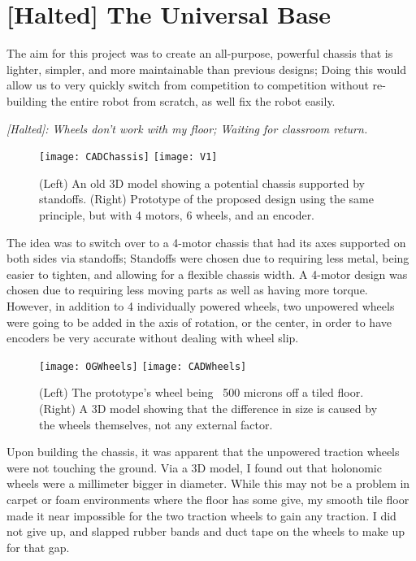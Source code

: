 \section{[Halted] The Universal Base}

The aim for this project was to create an all-purpose, powerful chassis that is lighter, simpler, and more maintainable than previous designs; Doing this would allow us to very quickly switch from competition to competition without re-building the entire robot from scratch, as well fix the robot easily.

\textit{[Halted]: Wheels don't work with my floor; Waiting for classroom return.}

\begin{figure}[h]
    \centering
    \texttt{[image: CADChassis]}
    \texttt{[image: V1]}
    \caption{
        (Left) An old 3D model showing a potential chassis supported by standoffs. (Right) Prototype of the proposed design using the same principle, but with 4 motors, 6 wheels, and an encoder.
    }
\end{figure}

The idea was to switch over to a 4-motor chassis that had its axes supported on both sides via standoffs; Standoffs were chosen due to requiring less metal, being easier to tighten, and allowing for a flexible chassis width. A 4-motor design was chosen due to requiring less moving parts as well as having more torque. However, in addition to 4 individually powered wheels, two unpowered wheels were going to be added in the axis of rotation, or the center, in order to have encoders be very accurate without dealing with wheel slip.

\begin{figure}[h]
    \centering
    \texttt{[image: OGWheels]}
    \texttt{[image: CADWheels]}
    \caption{
        (Left) The prototype's wheel being ~500 microns off a tiled floor. (Right) A 3D model showing that the difference in size is caused by the wheels themselves, not any external factor.
    }
\end{figure}

Upon building the chassis, it was apparent that the unpowered traction wheels were not touching the ground. Via a 3D model, I found out that holonomic wheels were a millimeter bigger in diameter. While this may not be a problem in carpet or foam environments where the floor has some give, my smooth tile floor made it near impossible for the two traction wheels to gain any traction. I did not give up, and slapped rubber bands and duct tape on the wheels to make up for that gap.

